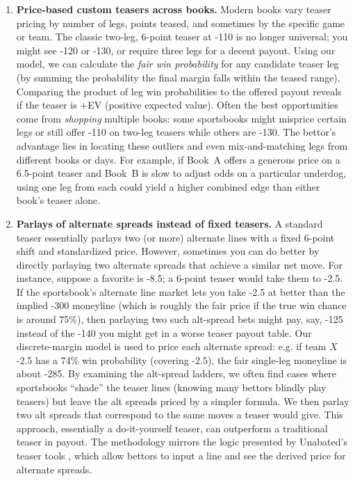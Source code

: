 \documentclass[12pt]{article}
\begin{document}
\begin{enumerate}
    \item \textbf{Price-based custom teasers across books.} Modern books vary teaser pricing by number of legs, points teased, and sometimes by the specific game or team. The classic two-leg, 6-point teaser at -110 is no longer universal; you might see -120 or -130, or require three legs for a decent payout. Using our model, we can calculate the \emph{fair win probability} for any candidate teaser leg (by summing the probability the final margin falls within the teased range). Comparing the product of leg win probabilities to the offered payout reveals if the teaser is +EV (positive expected value). Often the best opportunities come from \emph{shopping} multiple books: some sportsbooks might misprice certain legs or still offer -110 on two-leg teasers while others are -130. The bettor’s advantage lies in locating these outliers and even mix-and-matching legs from different books or days. For example, if Book~A offers a generous price on a 6.5-point teaser and Book~B is slow to adjust odds on a particular underdog, using one leg from each could yield a higher combined edge than either book’s teaser alone.
    
    \item \textbf{Parlays of alternate spreads instead of fixed teasers.} A standard teaser essentially parlays two (or more) alternate lines with a fixed 6-point shift and standardized price. However, sometimes you can do better by directly parlaying two alternate spreads that achieve a similar net move. For instance, suppose a favorite is -8.5; a 6-point teaser would take them to -2.5. If the sportsbook’s alternate line market lets you take -2.5 at better than the implied -300 moneyline (which is roughly the fair price if the true win chance is around 75\%), then parlaying two such alt-spread bets might pay, say, -125 instead of the -140 you might get in a worse teaser payout table. Our discrete-margin model is used to price each alternate spread: e.g. if team $X$ -2.5 has a 74\% win probability (covering -2.5), the fair single-leg moneyline is about -285. By examining the alt-spread ladders, we often find cases where sportsbooks “shade” the teaser lines (knowing many bettors blindly play teasers) but leave the alt spreads priced by a simpler formula. We then parlay two alt spreads that correspond to the same moves a teaser would give. This approach, essentially a do-it-yourself teaser, can outperform a traditional teaser in payout. The methodology mirrors the logic presented by Unabated’s teaser tools \cite{Andrews2024}, which allow bettors to input a line and see the derived price for alternate spreads.
    

\end{enumerate}
\end{document}
